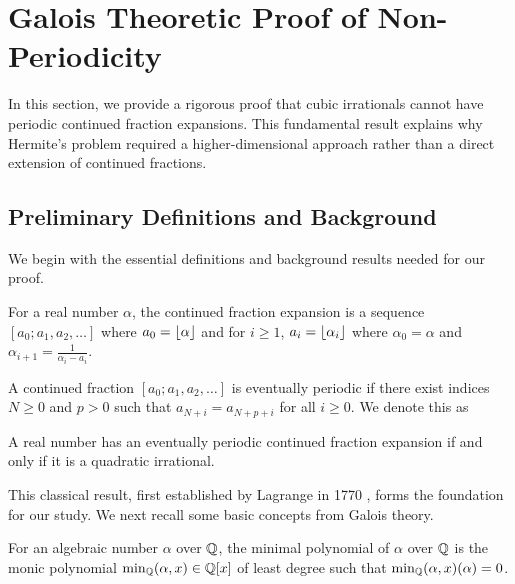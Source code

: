 \section{Galois Theoretic Proof of Non-Periodicity}\label{sec:galois_theory}

In this section, we provide a rigorous proof that cubic irrationals cannot have periodic continued fraction expansions. This fundamental result explains why Hermite's problem required a higher-dimensional approach rather than a direct extension of continued fractions.

\subsection{Preliminary Definitions and Background}

We begin with the essential definitions and background results needed for our proof.

\begin{definition}
For a real number $\alpha$, the continued fraction expansion is a sequence $[a_0; a_1, a_2, \ldots]$ where $a_0 = \lfloor \alpha \rfloor$ and for $i \geq 1$, $a_i = \lfloor \alpha_i \rfloor$ where $\alpha_0 = \alpha$ and $\alpha_{i+1} = \frac{1}{\alpha_i - a_i}$.
\end{definition}

\begin{definition}
A continued fraction $[a_0; a_1, a_2, \ldots]$ is eventually periodic if there exist indices $N \geq 0$ and $p > 0$ such that $a_{N+i} = a_{N+p+i}$ for all $i \geq 0$. 
We denote this as 
\begin{equation}
[a_0; a_1, \ldots, a_{N-1}, \overline{a_N, \ldots, a_{N+p-1}}]
\end{equation}
\end{definition}

\begin{theorem}\label{thm:lagrange}
A real number has an eventually periodic continued fraction expansion if and only if it is a quadratic irrational.
\end{theorem}

This classical result, first established by Lagrange in 1770 \cite{Lagrange1770}, forms the foundation for our study. We next recall some basic concepts from Galois theory.

\begin{definition}
For an algebraic number $\alpha$ over $\mathbb{Q}$, the minimal polynomial of $\alpha$ over $\mathbb{Q}$ is the monic polynomial $\text{min}_{\mathbb{Q}}(\alpha, x) \in \mathbb{Q}[x]$ of least degree such that $\text{min}_{\mathbb{Q}}(\alpha, x)(\alpha) = 0$.
\end{definition}

